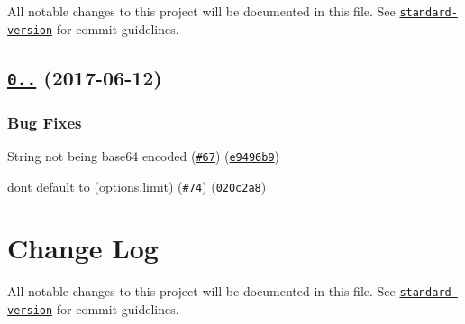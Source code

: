 All notable changes to this project will be documented in this file. See \href{https://github.com/conventional-changelog/standard-version}{\tt standard-\/version} for commit guidelines.

\label{_0.5.9}%
 \subsection*{\href{https://github.com/webpack/url-loader/compare/v0.5.8...v0.5.9}{\tt 0..} (2017-\/06-\/12)}

\subsubsection*{Bug Fixes}


\begin{DoxyItemize}
\item {\ttfamily String} not being {\ttfamily base64} encoded (\href{https://github.com/webpack/url-loader/issues/67}{\tt \#67}) (\href{https://github.com/webpack/url-loader/commit/e9496b9}{\tt e9496b9})
\item don\textquotesingle{}t default to {} ({\ttfamily options.\+limit}) (\href{https://github.com/webpack/url-loader/issues/74}{\tt \#74}) (\href{https://github.com/webpack/url-loader/commit/020c2a8}{\tt 020c2a8})
\end{DoxyItemize}

\section*{Change Log}

All notable changes to this project will be documented in this file. See \href{https://github.com/conventional-changelog/standard-version}{\tt standard-\/version} for commit guidelines. 